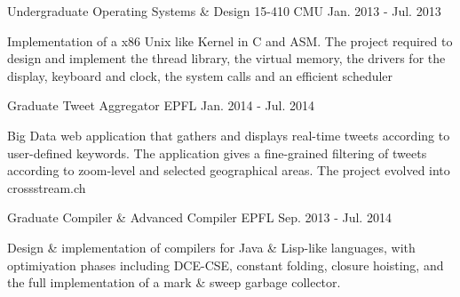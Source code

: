 


\begin{cventries}


\cventry
{Undergraduate} %
{Operating Systems \& Design 15-410} %
{CMU} %
{Jan. 2013 - Jul. 2013} %
{ %
\begin{cvitems}
\item {Implementation of a x86 Unix like Kernel in C and ASM. The project required to design and implement the thread library, the virtual memory, the drivers for the display, keyboard and clock, the system calls and an efficient scheduler}
\end{cvitems}
}

\cventry
{Graduate}
{Tweet Aggregator}
{EPFL}
{Jan. 2014 - Jul. 2014}
{
	\begin{cvitems}
	\item{Big Data web application that gathers and displays real-time tweets according to user-defined keywords. The application gives a fine-grained filtering of tweets according to zoom-level and selected geographical areas. The project evolved into crossstream.ch}
	\end{cvitems}
}

\cventry
{Graduate}
{Compiler \& Advanced Compiler}
{EPFL}
{Sep. 2013 - Jul. 2014}
{
	\begin{cvitems}
	\item{Design \& implementation of compilers for Java \& Lisp-like languages, with optimiyation phases including DCE-CSE, constant folding, closure hoisting, and the full implementation of a mark \& sweep garbage collector.}
	\end{cvitems}
}

\end{cventries}